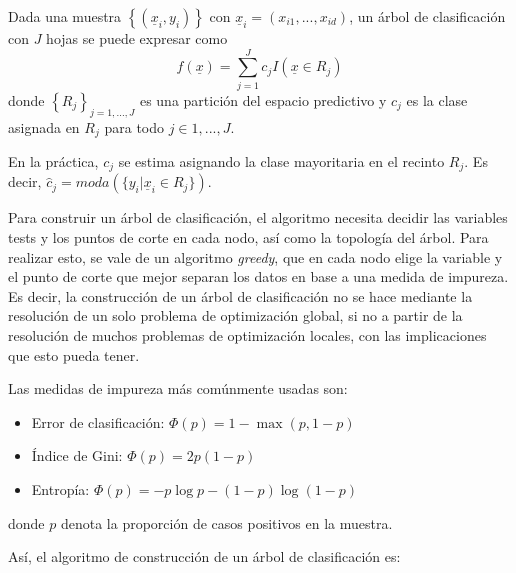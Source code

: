 \documentclass[12pt,a4paper,]{book}
\numberwithin{dummy}{section}
\theoremstyle{ocrenumbox}
\theoremstyle{blacknumex}
\theoremstyle{blacknumbox}
\theoremstyle{ocrenum}
\theoremstyle{ocrenum}
\begin{document}
Dada una muestra \(\left\{ (\underline x_i,y_i) \right\}\) con
\(\underline x_i = (x_{i1},...,x_{id})\), un árbol de clasificación con
\(J\) hojas se puede expresar como
\[f(\underline x) = \sum_{j=1}^J c_j I(\underline x \in R_j)\] donde
\(\left\{ R_j\right\}_{j=1,...,J}\) es una partición del espacio
predictivo y \(c_j\) es la clase asignada en \(R_j\) para todo
\(j \in {1,...,J}\).

En la práctica, \(c_j\) se estima asignando la clase mayoritaria en el
recinto \(R_j\). Es decir,
\(\hat c_j = moda(\{y_i | \underline x_i \in R_j\})\).

Para construir un árbol de clasificación, el algoritmo necesita decidir
las variables tests y los puntos de corte en cada nodo, así como la
topología del árbol. Para realizar esto, se vale de un algoritmo
\emph{greedy}, que en cada nodo elige la variable y el punto de corte
que mejor separan los datos en base a una medida de impureza. Es decir,
la construcción de un árbol de clasificación no se hace mediante la
resolución de un solo problema de optimización global, si no a partir de
la resolución de muchos problemas de optimización locales, con las
implicaciones que esto pueda tener.

Las medidas de impureza más comúnmente usadas son:

\begin{itemize}
\item
  Error de clasificación: \(\Phi(p) = 1 - \max(p,1-p)\)
\item
  Índice de Gini: \(\Phi(p) = 2p(1-p)\)
\item
  Entropía: \(\Phi(p) = -p \log p - (1 - p) \log (1 - p)\)
\end{itemize}

donde \(p\) denota la proporción de casos positivos en la muestra.

Así, el algoritmo de construcción de un árbol de clasificación es:
\end{document}
